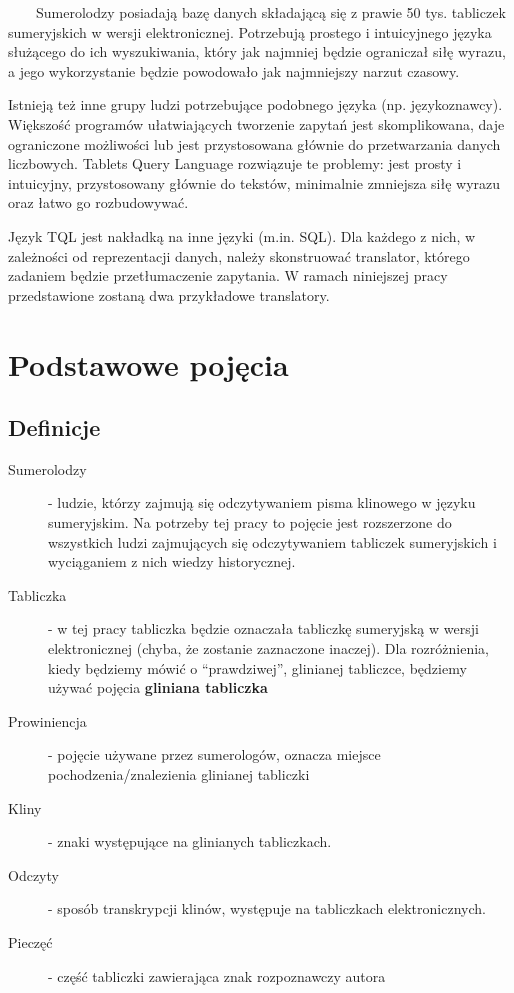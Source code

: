 \documentclass{pracamgr}
\begin{document}
\ \ \ \ Sumerolodzy posiadają bazę danych składającą się z prawie 50 tys. tabliczek sumeryjskich w wersji elektronicznej. Potrzebują prostego i intuicyjnego języka służącego do ich wyszukiwania, który jak najmniej będzie ograniczał siłę wyrazu, a jego wykorzystanie będzie powodowało jak najmniejszy narzut czasowy.

  Istnieją też inne grupy ludzi potrzebujące podobnego języka (np. językoznawcy). Większość programów ułatwiających tworzenie zapytań jest skomplikowana, daje ograniczone możliwości lub jest przystosowana głównie do przetwarzania danych liczbowych. Tablets Query Language rozwiązuje te problemy: jest prosty i intuicyjny, przystosowany głównie do tekstów, minimalnie zmniejsza siłę wyrazu oraz łatwo go rozbudowywać. 

  Język TQL jest nakładką na inne języki (m.in. SQL). Dla każdego z nich, w zależności od reprezentacji danych, należy skonstruować translator, którego zadaniem będzie przetłumaczenie zapytania. W ramach niniejszej pracy przedstawione zostaną dwa przykładowe translatory.

\chapter{Podstawowe pojęcia}\label{r:pojecia}
\section{Definicje}
\begin{description}
 \item[Sumerolodzy] - ludzie, którzy zajmują się odczytywaniem pisma klinowego w języku sumeryjskim. Na potrzeby tej pracy
		      to pojęcie jest rozszerzone do wszystkich ludzi zajmujących się odczytywaniem tabliczek sumeryjskich 
		      i wyciąganiem z nich wiedzy historycznej.
 \item[Tabliczka] - w tej pracy tabliczka będzie oznaczała tabliczkę sumeryjską w wersji elektronicznej 
		  (chyba, że zostanie zaznaczone inaczej). Dla rozróżnienia, kiedy będziemy mówić o ``prawdziwej'', 
		  glinianej tabliczce, będziemy używać pojęcia \textbf{gliniana tabliczka}
 \item[Prowiniencja] - pojęcie używane przez sumerologów, oznacza miejsce pochodzenia/znalezienia glinianej tabliczki
 \item[Kliny] - znaki występujące na glinianych tabliczkach.
 \item[Odczyty] - sposób transkrypcji klinów, występuje na tabliczkach elektronicznych.
 \item[Pieczęć] - część tabliczki zawierająca znak rozpoznawczy autora
\end{description}
\end{document}
